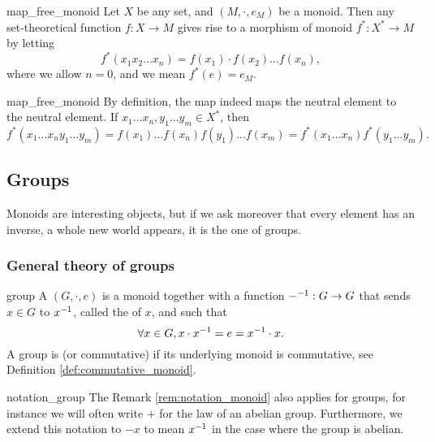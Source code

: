 \begin{clem}{}{map_free_monoid}
    Let \( X \) be any set, and \( (M, \cdot, e_M) \) be a monoid. Then any set-theoretical function \( f : X \to M \) gives rise to a morphism of monoid \( f^* : X^* \to M \) by letting
    \begin{equation*}
        f^*(x_1 x_2 \dots x_n) = f(x_1)\cdot f(x_2) \dots f(x_n),
    \end{equation*}
    where we allow \( n = 0 \), and we mean \( f^*(e) = e_M \).
\end{clem}
\begin{lemproof}{map_free_monoid}
    By definition, the map indeed maps the neutral element to the neutral element. If \( x_1\dots x_n, y_1 \dots y_m \in X^* \), then 
    \begin{equation*}
        f^*(x_1\dots x_n y_1 \dots y_m) = f(x_1) \dots f(x_n)f(y_1) \dots f(x_m) = f^*(x_1\dots x_n)f^*(y_1\dots y_m).
    \end{equation*}
\end{lemproof}

\subsection{Groups}

Monoids are interesting objects, but if we ask moreover that every element has an inverse, a whole new world appears, it is the one of groups.

\subsubsection{General theory of groups}

\begin{cdef}{}{group}
    A  \( (G, \cdot, e) \) is a monoid together with a function \( {-}^{-1} : G \to G \) that sends \( x \in G \) to \( {x}^{-1} \), called the  of \( x \), and such that
    \begin{equation*}
        \forall x \in G, x \cdot {x}^{-1} = e = {x}^{-1} \cdot x.
    \end{equation*}
    A group is  (or commutative) if its underlying monoid is commutative, see Definition \ref{def:commutative_monoid}.
\end{cdef}

\begin{crem}{}{notation_group}
    The Remark \ref{rem:notation_monoid} also applies for groups, for instance we will often write \( + \) for the law of an abelian group. Furthermore, we extend this notation to \( - x \) to mean \( {x}^{-1} \) in the case where the group is abelian.
\end{crem}

